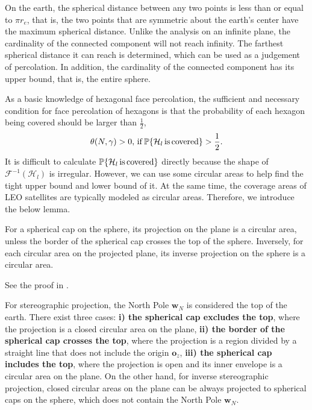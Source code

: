 \documentclass[final]{IEEEtran}
\begin{document}
\begin{remark}
    On the earth, the spherical distance between any two points is less than or equal to $\pi r_e$, that is, the two points that are symmetric about the earth's center have the maximum spherical distance. Unlike the analysis on an infinite plane, the cardinality of the connected component will not reach infinity. The farthest spherical distance it can reach is determined, which can be used as a judgement of percolation. In addition, the cardinality of the connected component has its upper bound, that is, the entire sphere.
\end{remark}
\indent As a basic knowledge of hexagonal face percolation, the sufficient and necessary condition for face percolation of hexagons is that the probability of each hexagon being covered should be larger than $\frac{1}{2}$, \ie
\begin{equation}
    \theta(N,\gamma)>0,\,{\rm if}\,\P\{\mathcal{H}_l\,{\rm is\, covered}\}>\frac{1}{2}.
\end{equation}
\indent It is difficult to calculate $\P\{\mathcal{H}_l\,{\rm is\, covered}\}$ directly because the shape of $\mathcal{F}^{-1}(\mathcal{H}_l)$ is irregular. However, we can use some circular areas to help find the tight upper bound and lower bound of it. At the same time, the coverage areas of LEO satellites are typically modeled as circular areas. Therefore, we introduce the below lemma.
\begin{lemma}
    For a spherical cap on the sphere, its projection on the plane is a circular area, unless the border of the spherical cap crosses the top of the sphere.
    Inversely, for each circular area on the projected plane, its inverse projection on the sphere is a circular area. 
    \label{lem:captocircle}
\end{lemma}
\begin{IEEEproof}
    See the proof in \cite[88.1]{pedoe2013geometry}. %
\end{IEEEproof}
\begin{remark}
    For stereographic projection, the North Pole $\textbf{w}_N$ is considered the top of the earth. There exist three cases: \textbf{i) the spherical cap excludes the top}, where the projection is a closed circular area on the plane, \textbf{ii) the border of the spherical cap crosses the top}, where the projection is a region divided by a straight line that does not include the origin $\textbf{o}_z$, \textbf{iii) the spherical cap includes the top}, where the projection is open and its inner envelope is a circular area on the plane. On the other hand, for inverse stereographic projection, closed circular areas on the plane can be always projected to spherical caps on the sphere, which does not contain the North Pole $\textbf{w}_N$.
\end{remark}
\end{document}
